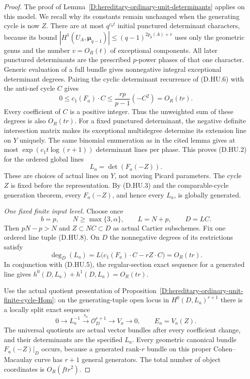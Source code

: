\begin{proof}
The proof of Lemma~\ref{D:hereditary-ordinary-unit-determinants}
applies on this model. We recall why its constants remain
unchanged when the generating cycle is now $Z$.
There are at most $q^{c_0t}$ initial punctured determinant
characters, because its bound
$|H^1(U_A,\boldsymbol\mu_{q-1})|
 \le(q-1)^{2p_g(A)+v}$ uses only the geometric genus and the
number $v=O_R(t)$ of exceptional components. All later
punctured determinants are the prescribed $p$-power phases
of that one character. Generic evaluation of a full bundle
gives nonnegative integral exceptional determinant degrees.
Pairing the cyclic determinant recurrence of (D.HU.6) with
the anti-nef cycle $C$ gives
\[
 0\le c_1(F_a)\cdot C
              \le\frac{rp}{p-1}(-C^2)=O_R(tr).          \tag{D.HU.7}
\]
Every coefficient of $C$ is a positive integer. Thus the
unweighted sum of these degrees is also $O_R(tr)$.
For a fixed punctured determinant, the negative definite
intersection matrix makes its exceptional multidegree
determine its extension line on $Y$ uniquely. The same
binomial enumeration as in the cited lemma gives at most
$\exp(c_1t\log(r+1))$ determinant lines per phase.
This proves (D.HU.2) for the ordered global lines
\[
                    L_a=\det(F_a(-Z)).                 \tag{D.HU.8}
\]
These are choices of actual lines on $Y$, not moving Picard
parameters. The cycle $Z$ is fixed before the representation.
By (D.HU.3) and the comparable-cycle generation theorem,
every $F_a(-Z)$, and hence every $L_a$, is globally generated.

\emph{One fixed finite input level.}
Choose once
\[
       b=p,\qquad N\ge\max\{3,\alpha\},\qquad L=N+p,
       \qquad D=LC.                                    \tag{D.HU.9}
\]
Then $pN-p>N$ and $Z\subset NC\subset D$ as actual
Cartier subschemes. Fix one ordered line tuple (D.HU.8).
On $D$ the nonnegative degrees of its restrictions satisfy
\[
 \deg_D(L_a)=L\bigl(c_1(F_a)\cdot C-rZ\cdot C\bigr)
                                                =O_R(tr).
                                                               \tag{D.HU.10}
\]
In conjunction with (D.HU.5), the regular-section exact
sequence for a generated line gives
$h^0(D,L_a)+h^1(D,L_a)=O_R(tr)$.

Use the actual quotient presentation of
Proposition~\ref{D:hereditary-ordinary-unit-finite-cycle-Hom}:
on the generating-tuple open locus in
$H^0(D,L_a)^{r+1}$ there is a locally split exact sequence
\[
 0\longrightarrow L_a^{-1}\xrightarrow{s_a}
       \mathcal O_D^{r+1}\longrightarrow V_a
       \longrightarrow0,
       \qquad E_a=V_a(Z).                               \tag{D.HU.11}
\]
The universal quotients are actual vector bundles after
every coefficient change, and their determinants are the
specified $L_a$. Every geometric canonical bundle
$F_a(-Z)|_D$ occurs, because a generated rank-$r$ bundle
on this proper Cohen--Macaulay curve has $r+1$ general
generators. The total number of object coordinates is
$O_R(ftr^2)$.


\end{proof}
